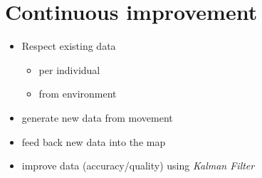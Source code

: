 \section{Continuous improvement}
\begin{itemize}
	\item{Respect existing data}
	\begin{itemize}
		\item{per individual}
		\item{from environment}
	\end{itemize}
	\item{generate new data from movement}
	\item{feed back new data into the map}
	\item{improve data (accuracy/quality) using \emph{Kalman Filter}}
\end{itemize}